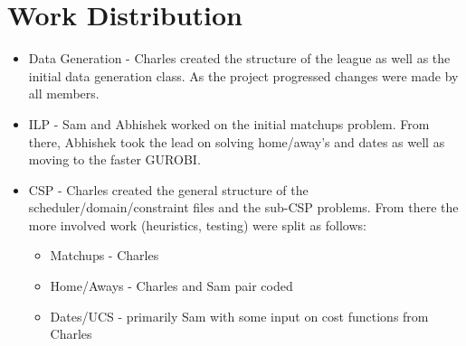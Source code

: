 \documentclass{article}
\begin{document}
	\section{Work Distribution}
	\begin{itemize}
	\item Data Generation - Charles created the structure of the league as well as the initial data generation class. As the project progressed changes were made by all members.
	\item ILP - Sam and Abhishek worked on the initial matchups problem. From there, Abhishek took the lead on solving home/away's and dates as well as moving to the faster GUROBI.
	\item CSP - Charles created the general structure of the scheduler/domain/constraint files and the sub-CSP problems. From there the more involved work (heuristics, testing) were split as follows:
		\begin{itemize}
			\item Matchups - Charles
			\item Home/Aways - Charles and Sam pair coded
			\item Dates/UCS - primarily Sam with some input on cost functions from Charles
		\end{itemize}
	\end{itemize}
\end{document}
